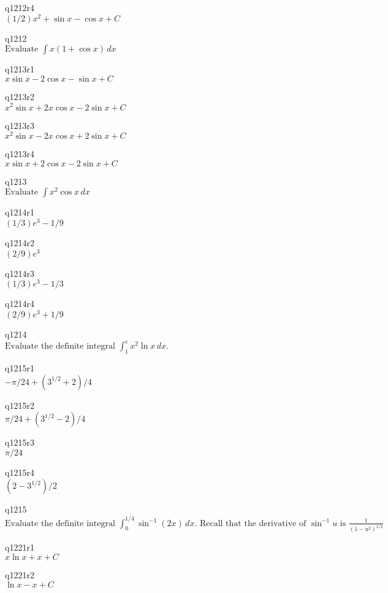 q1212r4\\
\(\displaystyle (1/2)x^2 + \sin x - \cos x + C \)

q1212\\
\(\displaystyle \text{Evaluate } \int x(1 + \cos x)\,dx \)

q1213r1\\
\(\displaystyle x \sin x - 2\cos x - \sin x + C \)

q1213r2\\
\(\displaystyle x^2 \sin x + 2x \cos x - 2 \sin x + C \)

q1213r3\\
\(\displaystyle x^2 \sin x - 2x\cos x + 2\sin x + C \)

q1213r4\\
\(\displaystyle x \sin x + 2\cos x - 2\sin x + C \)

q1213\\
\(\displaystyle \text{Evaluate } \int x^2 \cos x \, dx \)

q1214r1\\
\(\displaystyle (1/3)e^3 - 1/9 \)

q1214r2\\
\(\displaystyle (2/9)e^3 \)

q1214r3\\
\(\displaystyle (1/3)e^3 - 1/3 \)

q1214r4\\
\(\displaystyle (2/9)e^3 + 1/9 \)

q1214\\
\(\displaystyle \text{Evaluate the definite integral } \int_1^e x^2 \ln x \, dx. \)

q1215r1\\
\(\displaystyle -\pi/24 + (3^{1/2} + 2)/4 \)

q1215r2\\
\(\displaystyle \pi/24 + (3^{1/2} - 2)/4 \)

q1215r3\\
\(\displaystyle \pi/24 \)

q1215r4\\
\(\displaystyle (2-3^{1/2})/2 \)

q1215\\
\(\displaystyle \text{Evaluate the definite integral } \int_0^{1/4} \sin^{-1} (2x)\,dx. \text{ Recall that the derivative of } \sin^{-1} u \text{ is } \frac{1}{(1-u^2)^{1/2}} \)

q1221r1\\
\(\displaystyle x \ln x + x + C \)

q1221r2\\
\(\displaystyle \ln x - x + C \)

